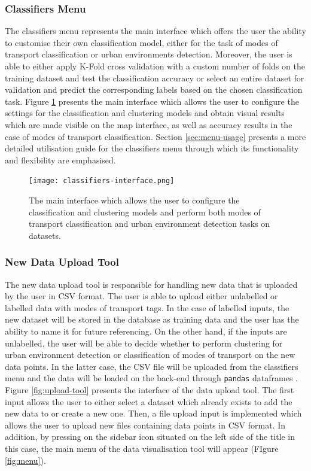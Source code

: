 \documentclass[bsc,frontabs,twoside,singlespacing, parskip,deptreport]{infthesis}     %
\begin{document}
\subsubsection*{Classifiers Menu}

The classifiers menu represents the main interface which offers the user the ability to customise their own classification model, either for the task of modes of transport classification or urban environments detection. Moreover, the user is able to either apply K-Fold cross validation with a custom number of folds on the training dataset and test the classification accuracy or select an entire dataset for validation and predict the corresponding labels based on the chosen classification task. Figure \ref{fig:classifiers-interface} presents the main interface which allows the user to configure the settings for the classification and clustering models and obtain visual results which are made visible on the map interface, as well as accuracy results in the case of modes of transport classification. Section \ref{sec:menu-usage} presents a more detailed utilisation guide for the classifiers menu through which its functionality and flexibility are emphasised.

\begin{figure}[h!]
  \texttt{[image: classifiers-interface.png]}
  \caption{The main interface which allows the user to configure the classification and clustering models and perform both modes of transport classification and urban environment detection tasks on datasets.}
  \label{fig:classifiers-interface}
\end{figure}

\subsubsection*{New Data Upload Tool}

The new data upload tool is responsible for handling new data that is uploaded by the user in CSV format. The user is able to upload either unlabelled or labelled data with modes of transport tags. In the case of labelled inputs, the new dataset will be stored in the database as training data and the user has the ability to name it for future referencing. On the other hand, if the inputs are unlabelled, the user will be able to decide whether to perform clustering for urban environment detection or classification of modes of transport on the new data points. In the latter case, the CSV file will be uploaded from the classifiers menu and the data will be loaded on the back-end through \texttt{pandas} dataframes \cite{pandas}. Figure \ref{fig:upload-tool} presents the interface of the data upload tool. The first input allows the user to either select a dataset which already exists to add the new data to or create a new one. Then, a file upload input is implemented which allows the user to upload new files containing data points in CSV format. In addition, by pressing on the sidebar icon situated on the left side of the title in this case, the main menu of the data visualisation tool will appear (FIgure \ref{fig:menu}).
\end{document}
